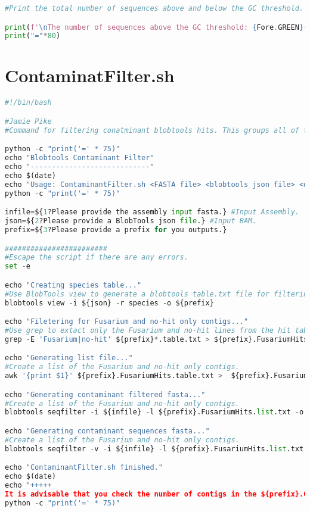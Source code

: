 \begin{lstlisting}[language=Python, caption=Script to separate contigs based on GC\% threshold]
#Print the total number of sequences above and below the GC threshold.

print(f'\nThe number of sequences above the GC threshold: {Fore.GREEN}{SeqAboveCount}{Fore.BLACK}.\nThe number of sequences below the GC threshold: {Fore.RED}{SeqBelowCount}{Fore.BLACK}.')
print("="*80)    
\end{lstlisting}

\section{ContaminatFilter.sh}\label{apx:ContamFilter}
\begin{lstlisting}[language=Python, caption=bash script to filter contigs from assembly that are predicted to belong to a non-\textit{Fusarium} genus by Blobtools.]
#!/bin/bash

#Jamie Pike
#Command for filtering conatminant blobtools hits. This groups all of the standard BlobTools commands I used to remove a contaminat contigs analysis. 

python -c "print('=' * 75)"
echo "Blobtools Contaminant Filter"
echo "----------------------------"
echo $(date)
echo "Usage: ContaminantFilter.sh <FASTA file> <blobtools json file> <outfile prefix>"
python -c "print('=' * 75)"

infile=${1?Please provide the assembly input fasta.} #Input Assembly.
json=${2?Please provide a BlobTools json file.} #Input BAM.
prefix=${3?Please provide a prefix for you outputs.} 

########################
#Escape the script if there are any errors. 
set -e 

echo "Creating species table..."
#Use BlobTools view to generate a blobtools table.txt file for filtering.
blobtools view -i ${json} -r species -o ${prefix}

echo "Filetering for Fusarium and no-hit only contigs..."
#Use grep to extact only the Fusarium and no-hit lines from the hit table.
grep -E 'Fusarium|no-hit' ${prefix}*.table.txt > ${prefix}.FusariumHits.table.txt

echo "Generating list file..."
#Create a list of the Fusarium and no-hit only contigs. 
awk '{print $1}' ${prefix}.FusariumHits.table.txt >  ${prefix}.FusariumHits.list.txt

echo "Generating contaminant filtered fasta..."
#Create a list of the Fusarium and no-hit only contigs. 
blobtools seqfilter -i ${infile} -l ${prefix}.FusariumHits.list.txt -o ${prefix}.ContaminantFiltered

echo "Generating contaminant sequences fasta..."
#Create a list of the Fusarium and no-hit only contigs. 
blobtools seqfilter -v -i ${infile} -l ${prefix}.FusariumHits.list.txt -o ${prefix}.ContaminantSequences

echo "ContaminantFilter.sh finished."
echo $(date)
echo "+++++
It is advisable that you check the number of contigs in the ${prefix}.ContaminantFiltered.fasta matches the number of lines in the ${prefix}.FusariumHits.table.txt file."
python -c "print('=' * 75)" 

\end{lstlisting}

